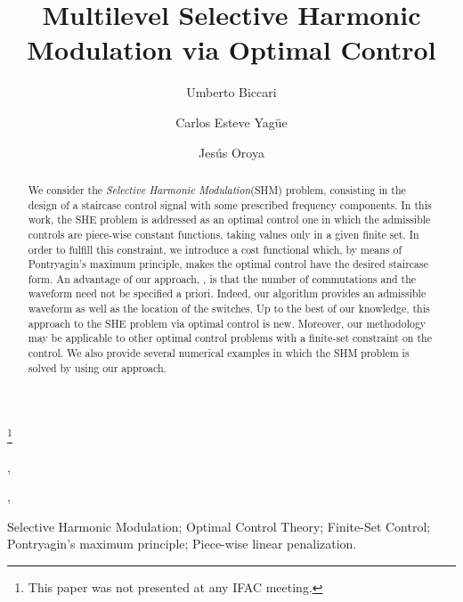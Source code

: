 \documentclass[twocolumn]{autart}    %
\begin{document}
\begin{frontmatter}

\title{Multilevel Selective Harmonic Modulation via Optimal Control} %

\thanks[footnoteinfo]{This paper was not presented at any IFAC meeting.}

\author[FD,UD]{Umberto Biccari},    %
\author[UAM,FD]{Carlos Esteve Yagüe},               %
\author[UD]{Jes\'us Oroya}  %
\address[FD]{Chair of Computational Mathematics, Fundaci\'on Deusto, Avenida de las Universidades 24, 48007 Bilbao, Basque Country, Spain.}  %
\address[UD]{Universidad de Deusto, Avenida de las Universidades 24, 48007 Bilbao, Basque Country, Spain.}  %
\address[UAM]{Departamento de Matem\'aticas, Universidad Aut\'onoma de Madrid, 28049 Madrid, Spain.}  %
          
\begin{keyword}                           %
Selective Harmonic Modulation; Optimal Control Theory; Finite-Set Control; Pontryagin's maximum principle; Piece-wise linear penalization.    %
\end{keyword}                             %


\begin{abstract}                          %
We consider the \emph{Selective Harmonic Modulation}(SHM) problem, consisting in the design of a staircase control signal with some prescribed frequency components. In this work, the SHE problem is addressed as an optimal control one in which the admissible controls are piece-wise constant functions, taking values only in a given finite set. In order to fulfill this constraint, we  introduce a cost functional  which, by means of Pontryagin's maximum principle, makes the optimal control have the desired staircase form. An advantage of our approach, , is that the number of commutations and the waveform need not be specified a priori. Indeed, our algorithm provides an admissible waveform as well as the location of the switches. Up to the best of our knowledge, this approach to the SHE problem via optimal control is new. Moreover, our methodology may be applicable to other optimal control problems with a finite-set constraint on the control. We also provide several numerical examples in which the SHM problem is solved by using our approach.
\end{abstract}


\end{frontmatter}
\end{document}
